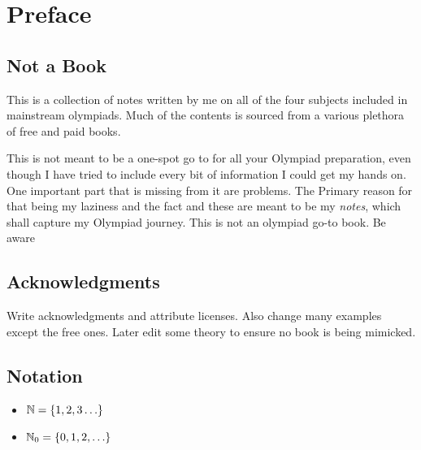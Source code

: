 \chapter{Preface}

\section{Not a Book}

This is a collection of notes written by me on all of the four subjects included in mainstream olympiads. Much of the contents is sourced from a various plethora of free and paid books.
\\
\par

This is not meant to be a one-spot go to for all your Olympiad preparation, even though I have tried to include every bit of information I could get my hands on. One important part that is missing from it are problems. The Primary reason for that being my laziness and the fact and these are meant to be my \textit{notes}, which shall capture my Olympiad journey. This is not an olympiad go-to book. Be aware

\section{Acknowledgments}

\begin{remark}
	Write acknowledgments and attribute licenses. Also change many examples except the free ones. Later edit some theory to ensure no book is being mimicked. 
\end{remark}

\section{Notation}

\begin{itemize}
	\item  \(\mathbb N = \{1, 2, 3 \ldots \}\)
	\item \(\mathbb N_0 =\{0, 1, 2, \ldots\}\)
\end{itemize}